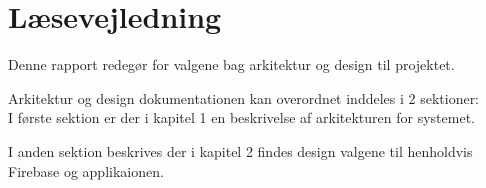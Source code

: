 \chapter*{Læsevejledning}
Denne rapport redegør for valgene bag arkitektur og design til projektet. 

Arkitektur og design dokumentationen kan overordnet inddeles i 2 sektioner:\\
I første sektion er der i kapitel 1 en beskrivelse af arkitekturen for systemet.

I anden sektion beskrives der i kapitel 2 findes design valgene til henholdvis Firebase og applikaionen.
